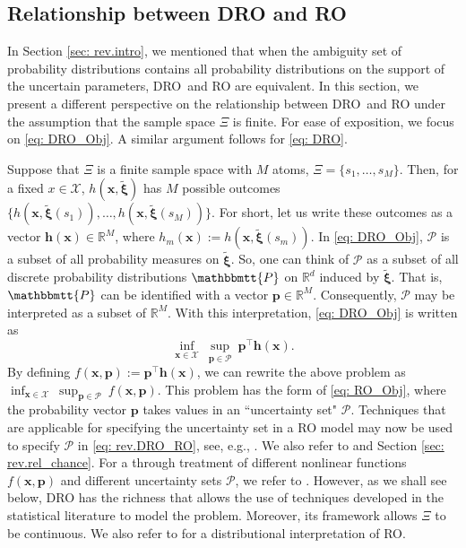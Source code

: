 \documentclass[final,onefignum,onetabnum]{class}
\newcommand{\bs}[1]{\boldsymbol{#1}} %
\newcommand{\Bs}[1]{\mathbb{#1}} %
\newcommand{\Ts}[1]{\mathbbmtt{#1}} %
\newcommand{\Cs}[1]{\mathcal{#1}} %
\newcommand{\txi}{\tilde{\bs{\xi}}}
\newcommand{\dro}{DRO}
\begin{document}
\subsection{Relationship between DRO and  RO}
\label{sec: rev.dro_ro}
In Section \ref{sec: rev.intro}, we mentioned that when  the ambiguity set of probability distributions  contains all probability distributions on the support of the uncertain parameters, \dro\ and RO are equivalent. In this section, we present a different perspective on the relationship between \dro\ and RO under the assumption that the sample space $\Xi$ is finite. 
For ease of exposition, we focus on \eqref{eq: DRO_Obj}. A similar argument follows for \eqref{eq: DRO}. 

Suppose that $\Xi$ is a finite sample space with $M$ atoms,  $\Xi=\{s_{1}, \ldots, s_{M}\}$. Then, for a fixed $x \in \Cs{X}$, $h(\bs{x}, \txi)$ has $M$ possible outcomes $\{h(\bs{x}, \txi(s_{1})), \ldots, h(\bs{x}, \txi(s_{M})) \}$. For short, let us write these outcomes as a vector $\bs{h}(\bs{x}) \in \Bs{R}^{M}$, where $h_{m}(\bs{x}):=h(\bs{x}, \txi(s_{m}))$. In \eqref{eq: DRO_Obj}, $\Cs{P}$ is a subset of all probability measures on $\txi$. So, one can think of $\Cs{P}$ as a subset of all discrete probability distributions $\Ts{P}$ on $\Bs{R}^{d}$ induced by $\txi$. That is, $\Ts{P}$  can be identified with a vector $\bs{p} \in \Bs{R}^{M}$. Consequently, $\Cs{P}$ may be interpreted as a subset of $\Bs{R}^{M}$. 
With this interpretation, \eqref{eq: DRO_Obj} is written as 
\begin{equation}
\label{eq: rev.DRO_RO}
\inf_{\bs{x} \in \Cs{X} } \ \sup_{\bs{p} \in \Cs{P}} \ 	  \bs{p}^{\top}\bs{h}(\bs{x}).
\end{equation}
By defining $f(\bs{x}, \bs{p}):= \bs{p}^{\top}\bs{h}(\bs{x})$, we can rewrite the above problem as  \linebreak $\inf_{\bs{x} \in \Cs{X} } \ \sup_{\bs{p} \in \Cs{P}} \ f(\bs{x}, \bs{p}) $. This problem  has the form of \eqref{eq: RO_Obj}, where  the probability vector $\bs{p}$ takes values in an ``uncertainty set"  $\Cs{P}$. 
Techniques that are applicable for specifying the uncertainty set in a RO model may now be used to specify $\Cs{P}$ in \eqref{eq: rev.DRO_RO}, see, e.g., \citet{ben2001Convex,ben2000robust,bertsimas2004norm,chen2007robust}. We also refer to \citet{bertsimas2018RO} and Section \ref{sec: rev.rel_chance}.  For a through treatment of different nonlinear functions $f(\bs{x},\bs{p})$ and different uncertainty sets $\Cs{P}$, we refer to \citet{bental2015nonlinear}. However, as we shall see below, DRO has the richness that allows the use of techniques developed in the statistical literature to model the problem. Moreover, its framework allows $\Xi$ to be continuous. 
We also refer to \citet{xu2012optimization} for a distributional interpretation of RO. 
\end{document}
